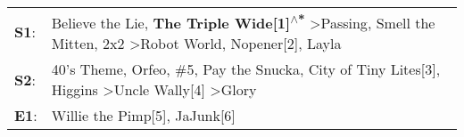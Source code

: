 \begin{supertabular}{p{0.03\textwidth}p{0.92\textwidth}}
 \textbf{S1}:  &  Believe the Lie\textsuperscript{}, \enspace \textbf{The Triple Wide[1]\textsuperscript{$\wedge$*}} \textgreater \enspace Passing\textsuperscript{}, \enspace Smell the Mitten\textsuperscript{}, \enspace 2x2\textsuperscript{} \textgreater \enspace Robot World\textsuperscript{}, \enspace Nopener[2]\textsuperscript{}, \enspace Layla\textsuperscript{}  \enspace  \\
 \textbf{S2}:  &                          40's Theme\textsuperscript{}, \enspace Orfeo\textsuperscript{}, \enspace \#5\textsuperscript{}, \enspace Pay the Snucka\textsuperscript{}, \enspace City of Tiny Lites[3]\textsuperscript{}, \enspace Higgins\textsuperscript{} \textgreater \enspace Uncle Wally[4]\textsuperscript{} \textgreater \enspace Glory\textsuperscript{}  \enspace  \\
 \textbf{E1}:  &                                                                                                                                                                                                                                                                                    Willie the Pimp[5]\textsuperscript{}, \enspace JaJunk[6]\textsuperscript{}  \enspace  \\
\end{supertabular}
